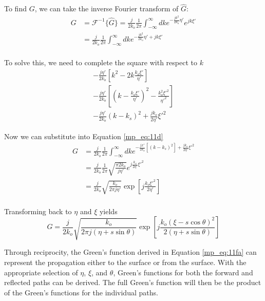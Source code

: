 To find $G$, we can take the inverse Fourier transform of $\hat{G}$:
\begin{equation}
\begin{aligned}
G &= \mathcal{F}^{-1}\{\hat{G}\} = \frac{j}{2k_o}\frac{1}{2\pi}\int_{-\infty}^{\infty}dk e^{-\frac{jk^2}{2k_o}\eta'}e^{jk\xi'} \\
& = \frac{j}{2k_o}\frac{1}{2\pi}\int_{-\infty}^{\infty}dk e^{-\frac{jk^2}{2k_o}\eta'+jk\xi'} \\
\end{aligned}
\label{mp_eq:11d}
\end{equation}

To solve this, we need to complete the square with respect to $k$
\begin{equation}
\begin{gathered}
-\frac{j\eta'}{2k_o}\left[k^2  -2k\frac{k_o\xi'}{\eta'}\right]\\
-\frac{j\eta'}{2k_o}\left[\left(k  -\frac{k_o\xi'}{\eta'}\right)^2 - \frac{k_o^2\xi'^2}{\eta'^2} \right]\\
-\frac{j\eta'}{2k_o}\left(k  -k_s\right)^2+ \frac{jk_o}{2\eta'}\xi'^2 
\end{gathered}
\label{mp_eq:11e}
\end{equation}

Now we can substitute into Equation \ref{mp_eq:11d}
\begin{equation}
\begin{aligned}
G &= \frac{j}{2k_o}\frac{1}{2\pi}\int_{-\infty}^{\infty}dk e^{-\frac{jx'}{2k_o}\left[\left(k  -k_s\right)^2\right]+ \frac{jk_o}{2\eta'}\xi'^2 } \\
&= \frac{j}{2k_o}\frac{1}{2\pi} \sqrt{\frac{\pi 2k_o}{j\eta'}}e^{j\frac{k_o}{2\eta'}\xi'^2 } \\
&= \frac{j}{2k_o}\sqrt{\frac{k_o}{2\pi j\eta'}}\exp\left[j\frac{k_o\xi'^2}{2\eta'} \right]\\
\end{aligned}
\label{mp_eq:11f}
\end{equation}

Transforming back to $\eta$ and $\xi$ yields
\begin{equation}
\boxed{G =  \frac{j}{2k_o}\sqrt{\frac{k_o}{2\pi j(\eta+s\sin\theta)}}\exp\left[j\frac{k_o(\xi-s\cos\theta)^2}{2(\eta + s\sin\theta)} \right]}
\label{mp_eq:11fa}
\end{equation}

Through reciprocity, the Green's function derived in Equation \ref{mp_eq:11fa} can represent the propagation either to the surface or from the surface. With the appropriate selection of $\eta$, $\xi$, and $\theta$, Green's functions for both the forward and reflected paths can be derived. The full Green's function will then be the product of the Green's functions for the individual paths.

